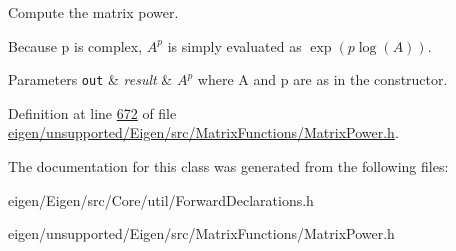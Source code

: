 Compute the matrix power. 

Because {\ttfamily p} is complex, $ A^p $ is simply evaluated as $ \exp(p \log(A)) $.


\begin{DoxyParams}[1]{Parameters}
\mbox{\tt out}  & {\em result} & $ A^p $ where {\ttfamily A} and {\ttfamily p} are as in the constructor. \\
\hline
\end{DoxyParams}


Definition at line \hyperlink{eigen_2unsupported_2_eigen_2src_2_matrix_functions_2_matrix_power_8h_source_l00672}{672} of file \hyperlink{eigen_2unsupported_2_eigen_2src_2_matrix_functions_2_matrix_power_8h_source}{eigen/unsupported/\+Eigen/src/\+Matrix\+Functions/\+Matrix\+Power.\+h}.



The documentation for this class was generated from the following files\+:\begin{DoxyCompactItemize}
\item 
eigen/\+Eigen/src/\+Core/util/\+Forward\+Declarations.\+h\item 
eigen/unsupported/\+Eigen/src/\+Matrix\+Functions/\+Matrix\+Power.\+h\end{DoxyCompactItemize}
